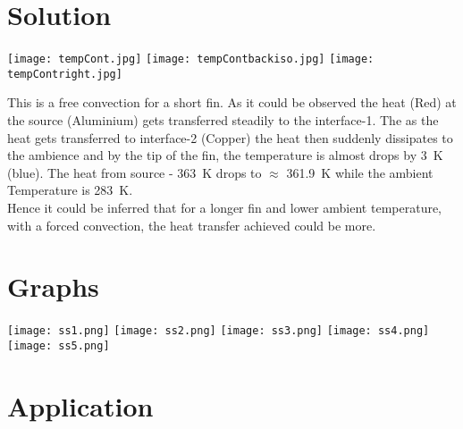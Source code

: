 \documentclass[twoside]{article}
\begin{document}
\vspace{1cm}

\section{Solution}
\begin{center}
    \texttt{[image: tempCont.jpg]}
    \texttt{[image: tempContbackiso.jpg]}
    \texttt{[image: tempContright.jpg]}
\end{center}
This is a free convection for a short fin. As it could be observed the heat (Red) at the source (Aluminium) gets transferred steadily to the interface-1. The as the heat gets transferred to interface-2 (Copper) the heat then suddenly dissipates to the ambience and by the tip of the fin, the temperature is almost drops by \SI{3}{\kelvin} (blue). The heat from source - \SI{363}{\kelvin} drops to $\approx$ \SI{361.9}{\kelvin} while the ambient Temperature is \SI{283}{\kelvin}. \\
Hence it could be inferred that for a longer fin and lower ambient temperature, with a forced convection, the heat transfer achieved could be more.  
\section{Graphs}
\begin{center}
    \texttt{[image: ss1.png]}
    \break 
    \texttt{[image: ss2.png]}
    \vspace{2cm}
    \texttt{[image: ss3.png]}
    \texttt{[image: ss4.png]}
    \vspace{2cm}
    \texttt{[image: ss5.png]}
\end{center}
\newpage
\section{Application}
\end{document}
